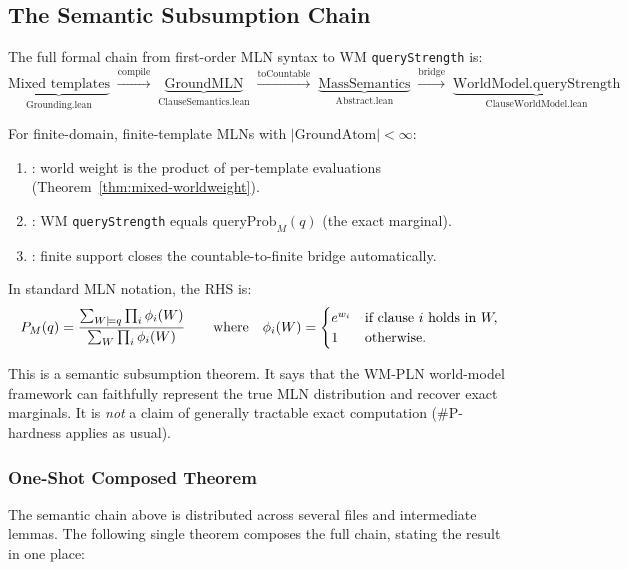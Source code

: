 \documentclass[11pt,openany]{report}
\begin{document}
\subsection{The Semantic Subsumption Chain}

The full formal chain from first-order MLN syntax to WM
\texttt{queryStrength} is:
\[
  \underbrace{\text{Mixed templates}}_{\text{Grounding.lean}}
  \;\xrightarrow{\mathrm{compile}}\;
  \underbrace{\text{GroundMLN}}_{\text{ClauseSemantics.lean}}
  \;\xrightarrow{\mathrm{toCountable}}\;
  \underbrace{\text{MassSemantics}}_{\text{Abstract.lean}}
  \;\xrightarrow{\mathrm{bridge}}\;
  \underbrace{\text{WorldModel.queryStrength}}_{\text{ClauseWorldModel.lean}}
\]

For finite-domain, finite-template MLNs with $|\mathrm{GroundAtom}| < \infty$:
\begin{enumerate}
\item {}: world weight is the
  product of per-template evaluations (Theorem~\ref{thm:mixed-worldweight}).
\item {}: WM \texttt{queryStrength}
  equals $\mathrm{queryProb}_M(q)$ (the exact marginal).
\item {}: finite
  support closes the countable-to-finite bridge automatically.
\end{enumerate}

In standard MLN notation, the RHS is:
\[
  P_M(q) = \frac{%
    \sum_{W \models q} \prod_i \phi_i(W)}{%
    \sum_W \prod_i \phi_i(W)}
  \qquad\text{where}\quad
  \phi_i(W) = \begin{cases}
    e^{w_i} & \text{if clause $i$ holds in } W, \\
    1 & \text{otherwise.}
  \end{cases}
\]

This is a semantic subsumption theorem.  It says that the WM-PLN
world-model framework can faithfully represent the true MLN distribution
and recover exact marginals.  It is \emph{not} a claim of generally
tractable exact computation (\#P-hardness applies as usual).

\subsubsection{One-Shot Composed Theorem}

The semantic chain above is distributed across several files and
intermediate lemmas.  The following single theorem composes the full
chain, stating the result in one place:
\end{document}
